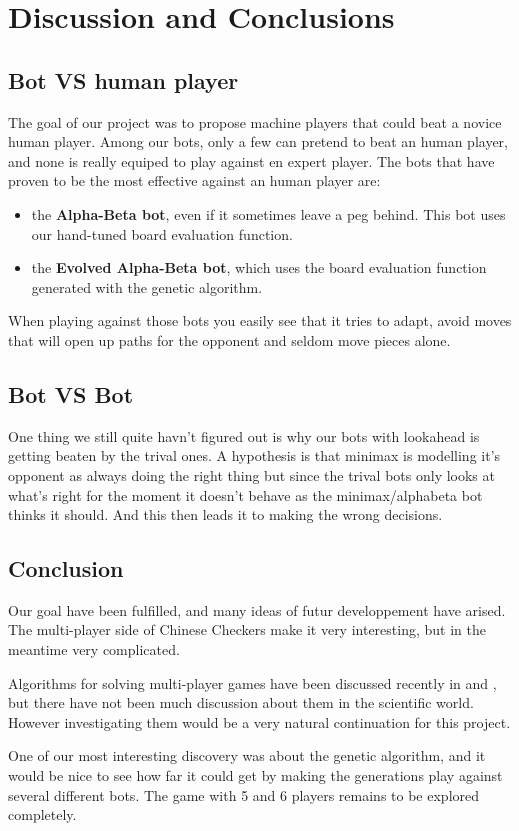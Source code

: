 \section{Discussion and Conclusions}
\subsection{Bot VS human player}
The goal of our project was to propose machine players that could beat a
novice human player. Among our bots, only a few can pretend to beat an human
player, and none is really equiped to play against en expert player. The bots
that have proven to be the most effective against an human player are:
\begin{itemize}
  \item the \textbf{Alpha-Beta bot}, even if it sometimes leave a peg behind.
        This bot uses our hand-tuned board evaluation function.
  \item the \textbf{Evolved Alpha-Beta bot}, which uses the board evaluation
        function generated with the genetic algorithm.
\end{itemize}

When playing against those bots you easily see that it tries to adapt, avoid
moves that will open up paths for the opponent and seldom move pieces alone.


\subsection{Bot VS Bot}
One thing we still quite havn't figured out is why our bots with lookahead is
getting beaten by the trival ones. A hypothesis is that minimax is modelling
it's opponent as always doing the right thing but since the trival bots only
looks at what's right for the moment it doesn't behave as the minimax/alphabeta
bot thinks it should. And this then leads it to making the wrong decisions.

\subsection{Conclusion}
Our goal have been fulfilled, and many ideas of futur developpement have
arised. The multi-player side of Chinese Checkers make it very interesting,
but in the meantime very complicated.

Algorithms for solving multi-player games have been discussed recently in
\cite{Hashavit} and \cite{bestreplysearch}, but there have not been much
discussion about them in the scientific world. However investigating them
would be a very natural continuation for this project.

One of our most interesting discovery was about the genetic algorithm, and
it would be nice to see how far it could get by making the generations play
against several different bots. The game with 5 and 6 players remains to be
explored completely.

